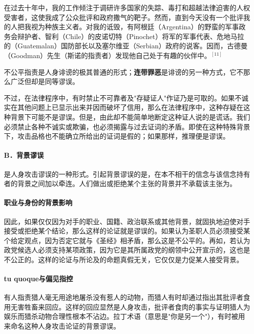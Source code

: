 \begin{displayquote}
在过去十年中，我的工作倾注于调研许多国家的失踪、毒打和超越法律迫害的人权受害者，这使我成了公众批评和政府撒气的靶子。然而，直到今天没有一个批评我的人把我视为种族主义者。对我的诋毁，有阿根廷（Argentina）的野蛮的军事政务会辩护者、智利（Chile）的皮诺切特（Pinochet）将军的军事代表、危地马拉的（Guatemalan）国防部长以及塞尔维亚（Serbian）政府的说客。因而，古德曼（Goodman）先生（斯诺的指责者）发现他自己处于有趣的伙伴中。${ }^{[11]}$
\end{displayquote}

不公平指责是人身诽谤的极其普通的形式；\textbf{连带罪恶}是诽谤的另一种方式，它不那么广泛但却是同等谬误。

不过，在法律程序中，有时禁止不可靠者及"存疑证人"作证乃是可取的。如果不诚实在其他问题上已显示出来并因而破坏了信用，那么在法律程序中，这种存疑在这种背景下可能不是谬误。但是，由此却不能简单地断定这种证人说的是谎话。我们必须禁止各种不诚实或欺骗，也必须揭露与过去证词的矛盾。即使在这种特殊背景下，攻击品格也不能确立所给出的证词是假的；如果那样，推理便是谬误。

\paragraph{B．背景谬误}

\begin{theorembox}[title=背景谬误的定义]
是人身攻击谬误的一种形式。引起背景谬误的是，在本不相干的信念与该信念持有者的背景之间加以牵连。人们做出或拒绝某个主张的背景并不承载该主张为。
\end{theorembox}

\paragraph{职业与身份的背景影响}
因此，如果仅仅因为对手的职业、国籍、政治联系或其他背景，就固执地迫使对手接受或拒绝某个结论，那么这样的论证就是谬误的。如果认为圣职人员必须接受某个给定观点，因为否定它就与《圣经》相矛盾，那么这是不公平的。再如，若认为政党候选人必须支持某项政策，因为它是其所属政党的纲领中公开宣示的，这也是不公正的。这样的论证与所论及的命题真假无关，它仅仅是力促某人接受背景。

\paragraph{tu quoque与偏见指控}
\begin{examplebox}[title=tu quoque谬误示例]
有人指责猎人毫无用途地屠杀没有惹人的动物，而猎人有时却通过指出其批评者食用无害牲畜来回应。这样的回应显然是人身攻击，批评者食肉的事实与证明猎人为娱乐而猎杀动物合理性根本不沾边。拉丁术语（意思是"你是另一个"），有时被用来命名这种人身攻击论证的背景谬误。
\end{examplebox}

